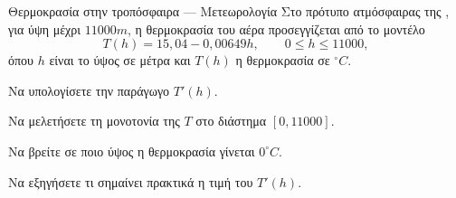 \begin{problhma}{Θερμοκρασία στην τροπόσφαιρα --- Μετεωρολογία}
Στο πρότυπο ατμόσφαιρας της , για ύψη μέχρι
\(11000\si{m}\), η θερμοκρασία του αέρα προσεγγίζεται από το μοντέλο
\cite{nasaGlennEarthAtmosphereModel}
\[
  T(h)=15{,}04-0{,}00649h,
  \qquad 0\leq h\leq11000,
\]
όπου \(h\) είναι το ύψος σε μέτρα και \(T(h)\) η θερμοκρασία σε
\({}^\circ C\).
\begin{alist}
  \item Να υπολογίσετε την παράγωγο \(T'(h)\).
  \item Να μελετήσετε τη μονοτονία της \(T\) στο διάστημα
        \([0,11000]\).
  \item Να βρείτε σε ποιο ύψος η θερμοκρασία γίνεται \(0^\circ C\).
  \item Να εξηγήσετε τι σημαίνει πρακτικά η τιμή του \(T'(h)\).
\end{alist}
\end{problhma}

